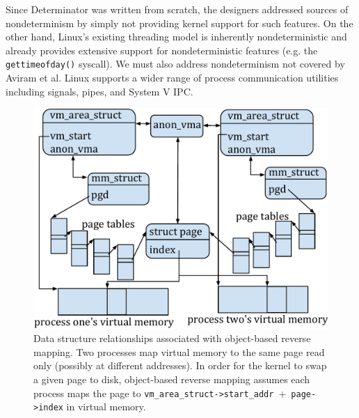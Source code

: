 \begin{itemize}

Since Determinator was
written from scratch, the designers addressed sources of nondeterminism by
simply not providing kernel support for such features. On the other hand,
Linux's existing threading model is inherently nondeterministic and already
provides extensive support for nondeterministic features (e.g. the
{\tt gettimeofday()} syscall). We must also address nondeterminism not covered
by Aviram et al. Linux supports a wider range of process communication utilities
including signals, pipes, and System V IPC.

\begin{figure}[t]
\includegraphics[scale=.39]{anon_vma.pdf}
\caption{Data structure relationships associated with object-based reverse
mapping. Two processes map virtual memory to the same page read only (possibly
at different addresses). In order for the kernel to swap a given page to disk,
object-based reverse mapping assumes each process maps the page to
\mbox{{\tt vm\_area\_struct->start\_addr} + {\tt page->index}} in virtual
memory.}
\label{fig:anon_vma}
\end{figure}


\end{itemize}
